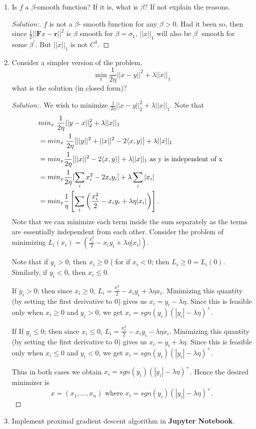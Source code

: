 \documentclass[a4paper,11pt,reqno]{amsart}
\theoremstyle{plain}
\theoremstyle{definition}
\theoremstyle{remark}
\numberwithin{equation}{section}
\begin{document}
\begin{enumerate}
\item Is $f$ a $\beta$-smooth function? If it is,  what is $\beta$? If not explain the reasons.
\begin{proof}[Solution:] $f$ is not a $\beta$- smooth function for any $\beta >0$. Had it been so, then since $\frac{1}{2}||\mathbf{F}x - \mathbf{r}||^2$ is $\beta$ smooth for $\beta = \sigma_1$, $||x||_1$ will also be $\beta^{'}$ smooth for some $\beta^{'}$. But $||x||_{1}$ is not $C^{1}$.
	\end{proof}
\vskip 16pt
\item Consider a simpler version of the problem,
\[
\min_x \frac{1}{2\eta}||x - y||^2 + \lambda||x||_1
\]
what is the solution (in closed form)?
\begin{proof}[Solution:] We wish to minimize $\frac{1}{2\eta}||x - y||^2_2 + \lambda ||x||_1$. Note that 
	\begin{align}
	&min_{x}\; \frac{1}{2\eta} ||y - x||^2_2 + \lambda||x||_1 \notag \\
	& = min_{x}\; \frac{1}{2\eta}[ ||y||^2 + ||x||^2 - 2 \langle x, y \rangle] + \lambda||x||_1 \notag \\
	& = min_{x} \frac{1}{2\eta}[||x||^2 - 2 \langle x, y \rangle] + \lambda||x||_1 \mbox{ as y is independent of x } \notag \\
	&=  min_{x} \frac{1}{2\eta}[ \sum_{i} x_i^2 - 2x_iy_i] + \lambda \sum_{i} |x_i| \notag \\	
	&= min_{x} \frac{1}{\eta} \left[\sum_{i} \left(\frac{x_i^2}{2} - x_iy_i + \lambda \eta |x_i|\right)\right]. 
	\end{align}
	Note that we can minimize each term inside the sum separately as the terms are essentially independent from each other. Consider the problem of minimizing 
	$L_i(x_i) = \left(\frac{x_i^2}{2} - x_iy_i + \lambda \eta |x_i|\right)$. 
	
	Note that if $y_i > 0$, then $x_i \geq 0$ ( for if $x_i <0$; then $L_i \geq 0 = L_i(0)$. Similarly, if $y_i < 0$, then $x_i \leq 0$. 
	
	If $y_i > 0$; then since $x_i \geq 0$, $L_i = \frac{x_i^2}{2} - x_iy_i + \lambda \eta x_i$. Minimizing this quantity (by setting the first derivative to $0$) gives us $x_i = y_i - \lambda \eta$. Since this is feasible only when $x_i \geq 0$ and $y_i > 0$, we get $x_i = sgn(y_i)(|y_i| - \lambda\eta)^{+}$. 
	
	If If $y_i \leq 0$; then since $x_i \leq 0$, $L_i = \frac{x_i^2}{2} - x_iy_i - \lambda \eta x_i$. Minimizing this quantity (by setting the first derivative to $0$) gives us $x_i = y_i + \lambda \eta$. Since this is feasible only when $x_i \leq 0$ and $y_i < 0$, we get $x_i = sgn(y_i)(|y_i| - \lambda\eta)^{+}$. 
	
	Thus in both cases we obtain $x_i = sgn(y_i)(|y_i| - \lambda\eta)^{+}$. Hence the desired minimizer is 
\[
x = (x_1,...,x_n) \mbox{ where }x_i = sgn(y_i)(|y_i| - \lambda\eta)^{+}.
\]
	\end{proof}
\vskip 16pt
\item Implement proximal gradient descent algorithm in \textbf{Jupyter Notebook}.
\end{enumerate}
\end{document}

